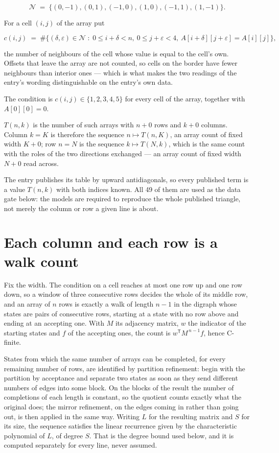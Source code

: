 \documentclass[11pt]{article}
\theoremstyle{definition}
\begin{document}
\[\mathcal{N} \;=\; \{(0,-1), (0,1), (-1,0), (1,0), (-1,1), (1,-1)\}.\]

For a cell $(i,j)$ of the array put

\[c(i,j) \;=\; \#\bigl\{(\delta,\varepsilon)\in\mathcal{N} \;:\; 0\le i+\delta<n,\ 0\le j+\varepsilon<4,\ A[i+\delta][j+\varepsilon] = A[i][j]\bigr\},\]

the number of neighbours of the cell whose value is equal to the cell's own. Offsets that leave the array are not counted, so cells on the border have fewer neighbours than interior ones --- which is what makes the two readings of the entry's wording distinguishable on the entry's own data.

The condition is $c(i,j) \in \{1, 2, 3, 4, 5\}$ for every cell of the array, together with $A[0][0]=0$.

$T(n,k)$ is the number of such arrays with $n + 0$ rows and $k + 0$ columns. Column $k = K$ is therefore the sequence $n \mapsto T(n,K)$, an array count of fixed width $K + 0$; row $n = N$ is the sequence $k \mapsto T(N,k)$, which is the same count with the roles of the two directions exchanged --- an array count of fixed width $N + 0$ read across.

The entry publishes its table by upward antidiagonals, so every published term is a value $T(n,k)$ with both indices known. All 49 of them are used as the data gate below: the models are required to reproduce the whole published triangle, not merely the column or row a given line is about.

\section{Each column and each row is a walk count}

Fix the width. The condition on a cell reaches at most one row up and one row down, so a window of three consecutive rows decides the whole of its middle row, and an array of $n$ rows is exactly a walk of length $n-1$ in the digraph whose states are pairs of consecutive rows, starting at a state with no row above and ending at an accepting one. With $M$ its adjacency matrix, $w$ the indicator of the starting states and $f$ of the accepting ones, the count is $w^{\mathsf T}M^{\,n-1}f$, hence C-finite.

States from which the same number of arrays can be completed, for every remaining number of rows, are identified by partition refinement: begin with the partition by acceptance and separate two states as soon as they send different numbers of edges into some block. On the blocks of the result the number of completions of each length is constant, so the quotient counts exactly what the original does; the mirror refinement, on the edges coming in rather than going out, is then applied in the same way. Writing $L$ for the resulting matrix and $S$ for its size, the sequence satisfies the linear recurrence given by the characteristic polynomial of $L$, of degree $S$. That is the degree bound used below, and it is computed separately for every line, never assumed.
\end{document}
